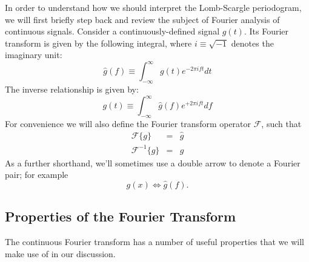 \documentclass[preprint]{aastex}
\newcommand{\eqlabel}[1]{\label{eq:#1}}
\begin{document}
In order to understand how we should interpret the Lomb-Scargle periodogram, we will first briefly step back and review the subject of Fourier analysis of continuous signals.
Consider a continuously-defined signal $g(t)$.
Its Fourier transform is given by the following integral, where $i\equiv\sqrt{-1}$ denotes the imaginary unit:
\begin{equation}
    \hat{g}(f) \equiv \int_{-\infty}^\infty g(t) e^{-2\pi i f t} dt
    \eqlabel{FT-def}
\end{equation}
The inverse relationship is given by:
\begin{equation}
    g(t) \equiv \int_{-\infty}^\infty \hat{g}(f) e^{+2\pi i f t} df
    \eqlabel{IFT-def}
\end{equation}
For convenience we will also define the Fourier transform operator
$\mathcal{F}$, such that
\begin{eqnarray}
    \mathcal{F}\{g\} &=& \hat{g} \\
    \mathcal{F}^{-1}\{\hat{g}\} &=& g
\end{eqnarray}
As a further shorthand, we'll sometimes use a double arrow to denote a Fourier
pair; for example
\begin{equation}
  g(x) \Longleftrightarrow \hat{g}(f).
\end{equation}

\subsection{Properties of the Fourier Transform}

The continuous Fourier transform has a number of useful properties that we will make use of in our discussion.
\end{document}

